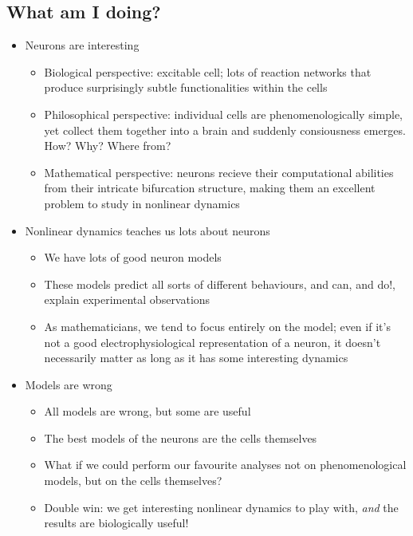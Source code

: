 \documentclass[11pt]{article}
\begin{document}
\subsection{What am I doing?}
\label{sec:org7cd7578}
\begin{itemize}
\item Neurons are interesting
\begin{itemize}
\item Biological perspective: excitable cell; lots of reaction networks that produce surprisingly subtle functionalities within the cells
\item Philosophical perspective: individual cells are phenomenologically simple, yet collect them together into a brain and suddenly consiousness emerges. How? Why? Where from?
\item Mathematical perspective: neurons recieve their computational abilities from their intricate bifurcation structure, making them an excellent problem to study in nonlinear dynamics
\end{itemize}

\item Nonlinear dynamics teaches us lots about neurons
\begin{itemize}
\item We have lots of good neuron models
\item These models predict all sorts of different behaviours, and can, and do!, explain experimental observations
\item As mathematicians, we tend to focus entirely on the model; even if it's not a good electrophysiological representation of a neuron, it doesn't necessarily matter as long as it has some interesting dynamics
\end{itemize}

\item Models are wrong
\begin{itemize}
\item All models are wrong, but some are useful
\item The best models of the neurons are the cells themselves
\item What if we could perform our favourite analyses not on phenomenological models, but on the cells themselves?
\item Double win: we get interesting nonlinear dynamics to play with, \emph{and} the results are biologically useful!
\end{itemize}
\end{itemize}
\end{document}
